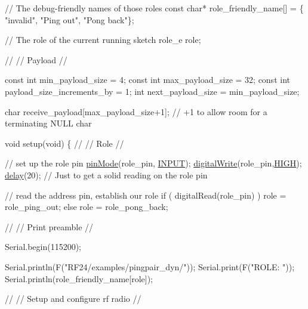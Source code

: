 \begin{DoxyCodeInclude}
\textcolor{comment}{// The debug-friendly names of those roles}
\textcolor{keyword}{const} \textcolor{keywordtype}{char}* role\_friendly\_name[] = \{ \textcolor{stringliteral}{"invalid"}, \textcolor{stringliteral}{"Ping out"}, \textcolor{stringliteral}{"Pong back"}\};

\textcolor{comment}{// The role of the current running sketch}
role\_e role;

\textcolor{comment}{//}
\textcolor{comment}{// Payload}
\textcolor{comment}{//}

\textcolor{keyword}{const} \textcolor{keywordtype}{int} min\_payload\_size = 4;
\textcolor{keyword}{const} \textcolor{keywordtype}{int} max\_payload\_size = 32;
\textcolor{keyword}{const} \textcolor{keywordtype}{int} payload\_size\_increments\_by = 1;
\textcolor{keywordtype}{int} next\_payload\_size = min\_payload\_size;

\textcolor{keywordtype}{char} receive\_payload[max\_payload\_size+1]; \textcolor{comment}{// +1 to allow room for a terminating NULL char}

\textcolor{keywordtype}{void} setup(\textcolor{keywordtype}{void})
\{
  \textcolor{comment}{//}
  \textcolor{comment}{// Role}
  \textcolor{comment}{//}

  \textcolor{comment}{// set up the role pin}
  \hyperlink{group__Porting__General_ga361649efb4f1e2fa3c870ca203497d5e}{pinMode}(role\_pin, \hyperlink{group__Porting__General_ga1bb283bd7893b9855e2f23013891fc82}{INPUT});
  \hyperlink{group__Porting__General_gabda89b115581947337690b2f85bfab6e}{digitalWrite}(role\_pin,\hyperlink{group__Porting__General_ga5bb885982ff66a2e0a0a45a8ee9c35e2}{HIGH});
  \hyperlink{group__Porting__General_ga70a331e8ddf9acf9d33c47b71cda4c5f}{delay}(20); \textcolor{comment}{// Just to get a solid reading on the role pin}

  \textcolor{comment}{// read the address pin, establish our role}
  \textcolor{keywordflow}{if} ( digitalRead(role\_pin) )
    role = role\_ping\_out;
  \textcolor{keywordflow}{else}
    role = role\_pong\_back;

  \textcolor{comment}{//}
  \textcolor{comment}{// Print preamble}
  \textcolor{comment}{//}

  Serial.begin(115200);
  
  Serial.println(F(\textcolor{stringliteral}{"RF24/examples/pingpair\_dyn/"}));
  Serial.print(F(\textcolor{stringliteral}{"ROLE: "}));
  Serial.println(role\_friendly\_name[role]);

  \textcolor{comment}{//}
  \textcolor{comment}{// Setup and configure rf radio}
  \textcolor{comment}{//}


\end{DoxyCodeInclude}

